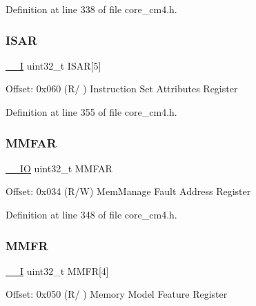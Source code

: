 Definition at line 338 of file core\+\_\+cm4.\+h.

\mbox{\label{struct_s_c_b___type_a130a0c6b3da7f29507a1888afbdce7ee}} 
\subsubsection{\texorpdfstring{I\+S\+AR}{ISAR}}
{\footnotesize\ttfamily \hyperlink{group___c_m_s_i_s__core__definitions_gaf63697ed9952cc71e1225efe205f6cd3}{\+\_\+\+\_\+I} uint32\+\_\+t I\+S\+AR\mbox{[}5\mbox{]}}

Offset\+: 0x060 (R/ ) Instruction Set Attributes Register 

Definition at line 355 of file core\+\_\+cm4.\+h.

\mbox{\label{struct_s_c_b___type_a88820a178974aa7b7927155cee5c47ed}} 
\subsubsection{\texorpdfstring{M\+M\+F\+AR}{MMFAR}}
{\footnotesize\ttfamily \hyperlink{group___c_m_s_i_s__core__definitions_gaec43007d9998a0a0e01faede4133d6be}{\+\_\+\+\_\+\+IO} uint32\+\_\+t M\+M\+F\+AR}

Offset\+: 0x034 (R/W) Mem\+Manage Fault Address Register 

Definition at line 348 of file core\+\_\+cm4.\+h.

\mbox{\label{struct_s_c_b___type_ab0dc71239f7d5ffe2e78e683b9530064}} 
\subsubsection{\texorpdfstring{M\+M\+FR}{MMFR}}
{\footnotesize\ttfamily \hyperlink{group___c_m_s_i_s__core__definitions_gaf63697ed9952cc71e1225efe205f6cd3}{\+\_\+\+\_\+I} uint32\+\_\+t M\+M\+FR\mbox{[}4\mbox{]}}

Offset\+: 0x050 (R/ ) Memory Model Feature Register 

